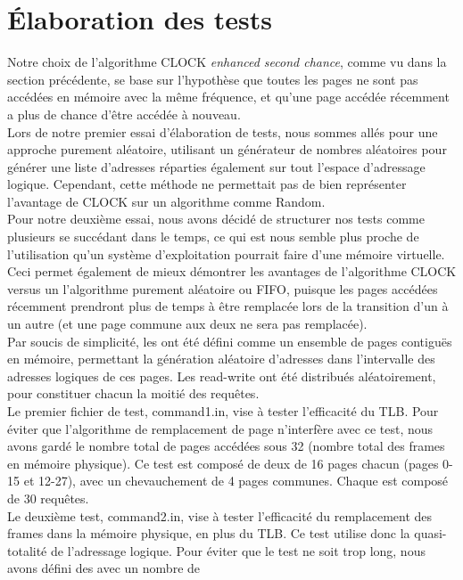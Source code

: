 \documentclass{article}
\begin{document}
\section{Élaboration des tests}
\setlength{\parindent}{20pt}
Notre choix de l’algorithme CLOCK \emph{enhanced second chance}, comme vu dans la section précédente, se base sur l’hypothèse que toutes les pages ne sont pas
 accédées en mémoire avec la même fréquence, et qu’une page accédée récemment a plus de chance d’être accédée à nouveau. 
\\
Lors de notre premier essai d’élaboration de tests, nous sommes allés pour une approche purement aléatoire, utilisant un générateur de nombres
 aléatoires pour générer une liste d’adresses réparties également sur tout l’espace d’adressage logique. Cependant, cette méthode ne permettait 
 pas de bien représenter l’avantage de CLOCK sur un algorithme comme Random. 
\\
Pour notre deuxième essai, nous avons décidé de structurer nos tests comme plusieurs  se succédant dans le temps, ce qui est nous 
semble plus proche de l’utilisation qu’un système d’exploitation pourrait faire d’une mémoire virtuelle. Ceci permet également de mieux démontrer 
les avantages de l’algorithme CLOCK versus un l’algorithme purement aléatoire ou FIFO, puisque les pages accédées récemment prendront plus de 
temps à être remplacée lors de la transition d’un  à un autre (et une page commune aux deux  ne sera pas remplacée).
\\
Par soucis de simplicité, les  ont été défini comme un ensemble de pages contiguës en mémoire, permettant la génération aléatoire 
d’adresses dans l’intervalle des adresses logiques de ces pages. Les read-write ont été distribués aléatoirement, pour constituer chacun la 
moitié des requêtes.    
\\
Le premier fichier de test, command1.in, vise à tester l’efficacité du TLB. Pour éviter que l’algorithme de remplacement de page n’interfère 
avec ce test, nous avons gardé le nombre total de pages accédées sous 32 (nombre total des frames en mémoire physique). Ce test est composé de 
deux  de 16 pages chacun (pages 0-15 et 12-27), avec un chevauchement de 4 pages communes. Chaque  est composé de 30 requêtes. 
\\
Le deuxième test, command2.in, vise à tester l’efficacité du remplacement des frames dans la mémoire physique, en plus du TLB. Ce test utilise 
donc la quasi-totalité de l’adressage logique. Pour éviter que le test ne soit trop long, nous avons défini des  avec un nombre de 
\end{document}
